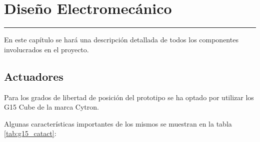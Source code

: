 \chapter{Diseño Electromecánico} \label{chap:Electronica}
\hrule
\vspace{3mm}
En este capítulo se hará una descripción detallada de todos los componentes involucrados en el proyecto.

\section{Actuadores} \label{sec:Electronica:Actuadores}
\label{sec:Electronica:Actuadores:G15}

    Para los grados de libertad de posición del prototipo se ha optado por utilizar los  G15 Cube de la marca Cytron.
    
    Algunas características importantes de los mismos se muestran en la tabla \ref{tab:g15_catact}:
    
